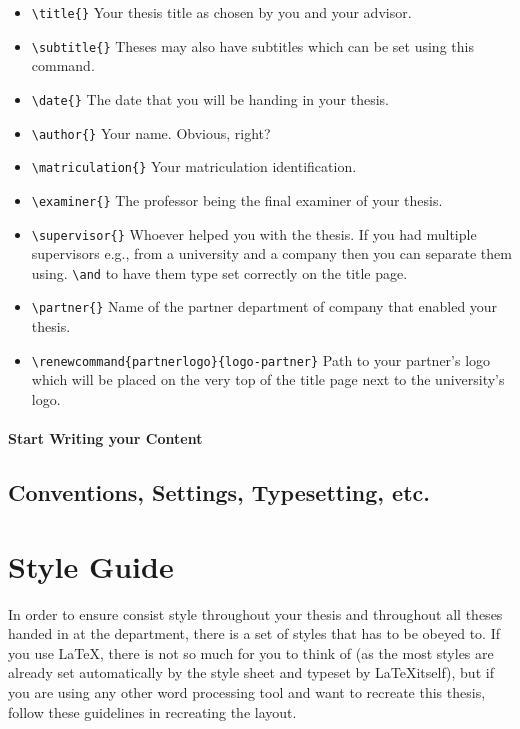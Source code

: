 \begin{itemize}
    \item \texttt{\textbackslash title\{\}} Your thesis title as chosen by you and your advisor.
    \item \texttt{\textbackslash subtitle\{\}} Theses may also have subtitles which can be set using this command.
    \item \texttt{\textbackslash date\{\}} The date that you will be handing in your thesis.
    \item \texttt{\textbackslash author\{\}} Your name. Obvious, right?
    \item \texttt{\textbackslash matriculation\{\}} Your matriculation identification.
    \item \texttt{\textbackslash examiner\{\}} The professor being the final examiner of your thesis.
    \item \texttt{\textbackslash supervisor\{\}} Whoever helped you with the thesis. If you had multiple supervisors e.g., from a university and a company then you can separate them using. \texttt{\textbackslash and} to have them type set correctly on the title page.
    \item \texttt{\textbackslash partner\{\}} Name of the partner department of company that enabled your thesis.
    \item \texttt{\textbackslash renewcommand\{partnerlogo\}\{logo-partner\}} Path to your partner's logo which will be placed on the very top of the title page next to the university's logo.
\end{itemize}


\subsubsection{Start Writing your Content}\label{sec:user-documentation:writing}


\section{Conventions, Settings, Typesetting, etc.}\label{sec:user-documentation:settings}



\chapter{Style Guide}\label{cha:style-guide}

\begin{intro}
    In order to ensure consist style throughout your thesis and throughout all theses handed in at the department, there is a set of styles that has to be obeyed to.
    If you use \LaTeX, there is not so much for you to think of (as the most styles are already set automatically by the style sheet and typeset by \LaTeX itself), but if you are using any other word processing tool and want to recreate this thesis, follow these guidelines in recreating the layout.
\end{intro}



